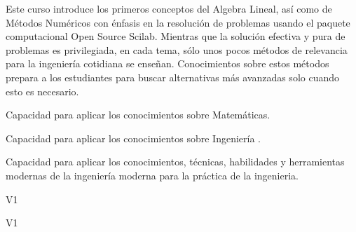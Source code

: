 \begin{syllabus}


\begin{justification}
   Este curso introduce los primeros conceptos del Algebra Lineal, así como de Métodos Numéricos con énfasis en la resolución de problemas usando el paquete computacional Open Source Scilab. Mientras que la solución efectiva y pura de problemas es privilegiada, en cada tema, sólo unos pocos métodos de relevancia para la ingeniería cotidiana se enseñan. Conocimientos sobre estos métodos prepara a los estudiantes para buscar alternativas más avanzadas solo cuando esto es necesario.
 \end{justification}
 
 \begin{goals}
 \item Capacidad para aplicar los conocimientos sobre Matemáticas.
 \item Capacidad para aplicar los conocimientos sobre Ingeniería .
 \item Capacidad para aplicar los conocimientos, técnicas, habilidades y herramientas modernas de la ingeniería moderna para la práctica de la ingenieria.
 \end{goals}
 
 \begin{outcomes}{V1}
     \item {}
     \item {}
 \end{outcomes}
 
 \begin{competences}{V1}
     \item {} 
     \item {} 
     \item {} 
 \end{competences}
 

\end{syllabus}
